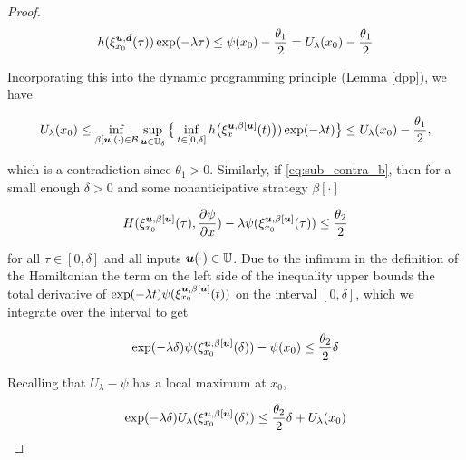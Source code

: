 \begin{for_journal}
\begin{proof}
\begin{equation}
h(\xi_{x_0}^{\bm{u}, \bm{d}}(\tau))\exp(-\lambda \tau) \leq \psi(x_0) - \frac{\theta_1}{2} = U_{\lambda}(x_0) - \frac{\theta_1}{2}
\end{equation}

Incorporating this into the dynamic programming principle (Lemma \ref{dpp}), we have 

\begin{equation}
U_{\lambda}(x_0) \leq \inf_{\beta[\bm{u}](\cdot) \in \mathcal{B}} \sup_{\bm{u} \in \mathbb{U}_\delta}
\big \{\inf_{t \in [0, \delta]} h\big(\xi_{x}^{\bm{u},\beta[\bm{u}]}(t)\big))\exp(-\lambda  t) \big \} \leq U_{\lambda}(x_0) - \frac{\theta_1}{2},
\end{equation}

\noindent which is a contradiction since $\theta_1>0$. Similarly, if \eqref{eq:sub_contra_b}, then for a small enough $\delta>0$ and some nonanticipative strategy $\beta[\cdot]$ 

\begin{equation}
H(\xi_{x_0}^{\bm{u},\beta[\bm{u}]}(\tau), \frac{\partial \psi}{\partial x}) - \lambda \psi(\xi_{x_0}^{\bm{u},\beta[\bm{u}]}(\tau)) \leq \frac{\theta_2}{2}
\end{equation}

\noindent for all $\tau \in [0,\delta]$ and all inputs $\bm{u}(\cdot) \in \mathbb{U}$. Due to the infimum in the definition of the Hamiltonian the term on the left side of the inequality upper bounds the total derivative of $\exp(-\lambda t)\psi(\xi_{x_0}^{\bm{u},\beta[\bm{u}]}(t))$ on the interval $[0,\delta]$,  which we integrate over the interval to get



\begin{equation}
\exp(-\lambda \delta)\psi(\xi_{x_0}^{\bm{u},\beta[\bm{u}]}(\delta))-\psi(x_0) \leq \frac{\theta_2}{2} \delta
\end{equation}

Recalling that $U_{\lambda}-\psi$ has a local maximum at $x_0$,

\begin{equation}
\exp(-\lambda \delta)U_{\lambda}(\xi_{x_0}^{\bm{u},\beta[\bm{u}]}(\delta)) \leq \frac{\theta_2}{2} \delta + U_{\lambda}(x_0)
\end{equation}


\end{proof}
\end{for_journal}
